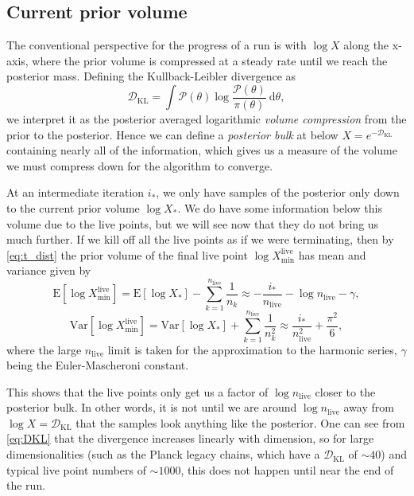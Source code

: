 \documentclass[usenatbib]{mnras}
\newcommand{\nlive}{n_\mathrm{live}}
\newcommand{\DKL}{\mathcal{D}_\mathrm{KL}}
\begin{document}
\subsection{Current prior volume}\label{sec:volume_convergence}
The conventional perspective for the progress of a run is with $\log X$ along the x-axis, where the prior volume is compressed at a steady rate until we reach the posterior mass. Defining the Kullback-Leibler divergence as
\begin{equation}\label{eq:DKL}
	\DKL = \int \mathcal{P}(\theta) \log \frac{\mathcal{P}(\theta)}{\pi(\theta)}\ \mathrm{d}\theta,
\end{equation}
we interpret it as the posterior averaged logarithmic \textit{volume compression} from the prior to the posterior. Hence we can define a  \textit{posterior bulk} at below $X = e^{-\DKL}$ containing nearly all of the information, which gives us a measure of the volume we must compress down for the algorithm to converge.
\par
At an intermediate iteration $i_*$, we only have samples of the posterior only down to the current prior volume $\log X_*$. We do have some information below this volume due to the live points, but we will see now that they do not bring us much further. If we kill off all the live points as if we were terminating, then by \cref{eq:t_dist} the prior volume of the final live point $\log X_\mathrm{min}^{\mathrm{live}}$ has mean and variance given by
\begin{equation}
	\mathrm{E}[\log X_\mathrm{min}^{\mathrm{live}}] = \mathrm{E}[\log X_*] - \sum_{k=1}^{\nlive} \frac{1}{n_k} \approx -\frac{i_*}{\nlive} - \log \nlive - \gamma,
\end{equation}
\begin{equation}
	\mathrm{Var}[\log X_\mathrm{min}^{\mathrm{live}}] = \mathrm{Var}[\log X_*] + \sum_{k=1}^{\nlive} \frac{1}{n_k^2} \approx \frac{i_*}{\nlive^2} + \frac{\pi^2}{6},
\end{equation}
where the large $\nlive$ limit is taken for the approximation to the harmonic series, $\gamma$ being the Euler-Mascheroni constant.
\par
This shows that the live points only get us a factor of $\log \nlive$ closer to the posterior bulk. In other words, it is not until we are around $\log \nlive$ away from $\log X = \DKL$ that the samples look anything like the posterior. One can see from \cref{eq:DKL} that the divergence increases linearly with dimension, so for large dimensionalities (such as the Planck legacy chains, which have a $\DKL$ of $\sim 40$) and typical live point numbers of  $\sim 1000$, this does not happen until near the end of the run.
\end{document}
